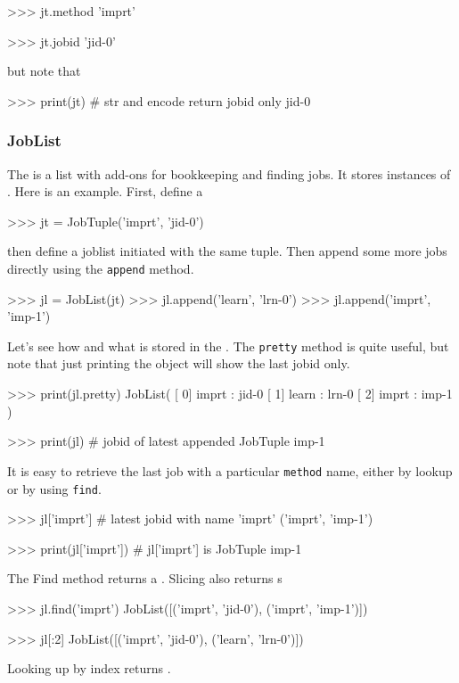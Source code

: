 \begin{pythonMID}
>>> jt.method
'imprt'

>>> jt.jobid
'jid-0'
\end{pythonMID}
but note that

\begin{pythonEND}
>>> print(jt)  # str and encode return jobid only
jid-0
\end{pythonEND}



\subsubsection{JobList}

\label{sec:joblist}
The \joblist is a list with add-ons for bookkeeping and finding jobs.
It stores instances of \jobtuple.  Here is an example.  First, define
a \jobtuple

\begin{pythonBEG}
>>> jt = JobTuple('imprt', 'jid-0')
\end{pythonBEG}
then define a joblist initiated with the same tuple.  Then append some
more jobs directly using the \texttt{append} method.

\begin{pythonMID}
>>> jl = JobList(jt)
>>> jl.append('learn', 'lrn-0')
>>> jl.append('imprt', 'imp-1')
\end{pythonMID}
Let's see how and what is stored in the \joblist.  The \texttt{pretty}
method is quite useful, but note that just printing the object will
show the last jobid only.

\begin{pythonMID}
>>> print(jl.pretty)
JobList(
   [  0]  imprt : jid-0
   [  1]  learn : lrn-0
   [  2]  imprt : imp-1
)

>>>  print(jl)  # jobid of latest appended JobTuple
imp-1
\end{pythonMID}

It is easy to retrieve the last job with a particular \texttt{method}
name, either by lookup or by using \texttt{find}.

\begin{pythonMID}
>>> jl['imprt']         # latest jobid with name 'imprt'
('imprt', 'imp-1')

>>> print(jl['imprt'])   # jl['imprt'] is JobTuple
imp-1
\end{pythonMID}
The Find method returns a \joblist.  Slicing also returns {\joblist}s

\begin{pythonMID}
>>> jl.find('imprt')
JobList([('imprt', 'jid-0'), ('imprt', 'imp-1')])

>>> jl[:2]
JobList([('imprt', 'jid-0'), ('learn', 'lrn-0')])
\end{pythonMID}
Looking up by index returns \jobtuple.

